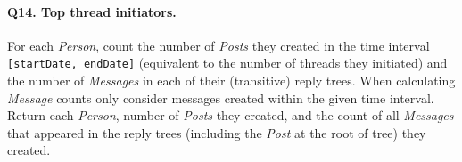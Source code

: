 \paragraph{\textbf{Q14}. Top thread initiators.}
For each \emph{Person}, count the number of \emph{Posts} they created in
the time interval \texttt{{[}startDate,\ endDate{]}} (equivalent to the
number of threads they initiated) and the number of \emph{Messages} in
each of their (transitive) reply trees. When calculating \emph{Message}
counts only consider messages created within the given time interval.
Return each \emph{Person}, number of \emph{Posts} they created, and the
count of all \emph{Messages} that appeared in the reply trees (including
the \emph{Post} at the root of tree) they created.
